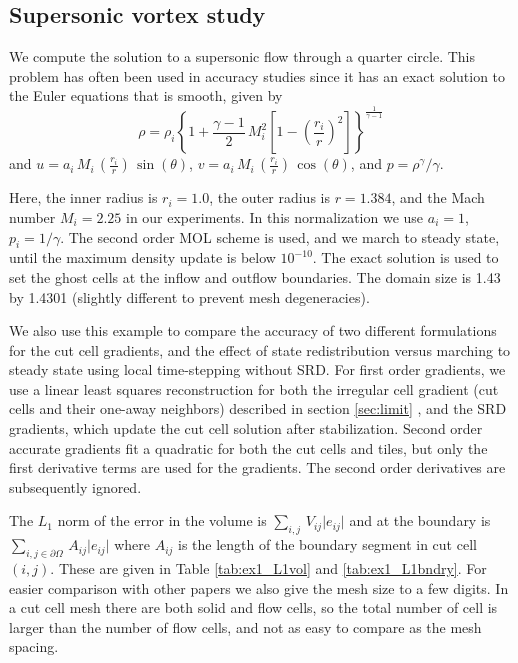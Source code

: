 \subsection{Supersonic vortex study}\label{sec:ssv}
We compute the solution to a supersonic flow 
through a quarter circle.  This problem has often been used in accuracy 
studies \cite{aftosmis:acc} since it has an exact solution to the Euler
equations that is smooth, given by 
\begin{equation}
\rho = \rho_i \left \{ 1 + \frac{\gamma-1}{2} \, M_i^2 \left [ 1 - (\frac{r_i}{r})^2
\right ] \right \} ^
{\frac{1}{\gamma-1}}
\end{equation}
and $ u = a_i \, M_i \, (\frac{r_i}{r})\,  \sin (\theta)$, 
$ v = a_i\,  M_i\,  (\frac{r_i}{r})\,  \cos(\theta)$, and
$ p = \rho^\gamma / \gamma$.

Here, the inner radius is $r_i = 1.0$,  the outer radius
is $r = 1.384$, and the Mach number $M_i = 2.25$ in our experiments. In this
normalization we use $a_i = 1$, $p_i = 1/\gamma$. 
The second order MOL scheme is used, and we march
to steady state, until the maximum density update is below $10^{-10}$.  
The exact solution is used to set the ghost cells at the inflow and
outflow boundaries. The domain size is 1.43 by 1.4301 (slightly different
to prevent mesh  degeneracies).  

We also use this example to compare the accuracy of two different formulations
for the cut cell gradients, and the effect of state redistribution versus 
marching to steady state using local time-stepping without SRD.  
For first order gradients, we use a linear least squares reconstruction for
both the irregular cell gradient (cut cells and their one-away neighbors) 
described in section \ref{sec:limit} , and the SRD gradients, which 
update the cut cell solution after stabilization. Second order accurate 
gradients fit a quadratic for both
the cut cells and tiles, but only the first derivative terms are used for 
the gradients. The second order derivatives are subsequently ignored.  

The $L_1$ norm of the error in the volume is $\sum_{i,j} \,
V_{ij} \lvert e_{ij } \rvert$ and at the boundary is $ \sum_{{i,j} \in \partial \Omega} \, A_{ij} \lvert e_{ij
} \rvert$ where $A_{ij}$ is the length of the boundary segment in cut cell $(i,j)$.
These are given in Table \ref{tab:ex1_L1vol} and \ref{tab:ex1_L1bndry}. 
For easier comparison with other papers we also give the mesh size 
to a few digits. In  a cut cell mesh there are both solid and
flow cells, so the total number of cell is larger than the number of
flow cells, and not as easy to compare as the mesh spacing.

